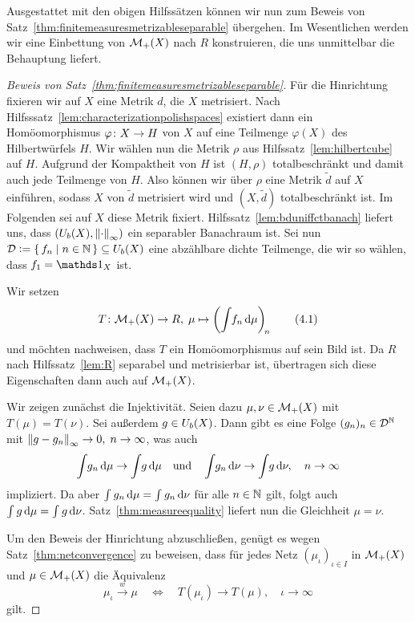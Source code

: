 \documentclass[../main/main.tex]{subfiles}
\begin{document}
	Ausgestattet mit den obigen Hilfssätzen können wir nun zum Beweis von Satz~\ref{thm:finitemeasuresmetrizableseparable} übergehen. Im Wesentlichen werden wir eine Einbettung von $\mathcal{M}_{+}(X)$ nach $R$ konstruieren, die uns unmittelbar die Behauptung liefert.
	
	\begin{proof}[Beweis von Satz~\ref{thm:finitemeasuresmetrizableseparable}]
		Für die Hinrichtung fixieren wir auf $X$ eine Metrik $d$, die $X$ metrisiert. 
		Nach Hilfsssatz~\ref{lem:characterizationpolishspaces} existiert dann ein Homöomorphismus $\varphi \colon X \to H$ von
		$X$ auf eine Teilmenge $\varphi(X)$ des Hilbertwürfels $H$. Wir wählen nun die Metrik $\rho$ aus Hilfssatz~\ref{lem:hilbertcube} auf $H$. Aufgrund der Kompaktheit von $H$ ist
		$(H, \rho)$ totalbeschränkt und damit auch jede Teilmenge von $H$. Also können wir über $\rho$ eine Metrik $\tilde{d}$ auf $X$ einführen, sodass $X$ von $\tilde{d}$ 
		metrisiert wird und $(X, \tilde{d})$ totalbeschränkt ist. Im Folgenden sei auf $X$ diese Metrik fixiert. Hilfssatz~\ref{lem:bduniffctbanach} liefert uns, dass 
		$(U_b(X), \left\lVert\cdot\right\rVert_\infty)$ ein separabler Banachraum ist. Sei nun $\mathcal{D} \vcentcolon = \left\{\, f_n \; \middle| \; n \in \mathbb{N} \,\right\} \subseteq U_b(X)$ eine abzählbare dichte Teilmenge, 
		die wir so wählen, dass $f_1 = \indfct_X$ ist.
		
		Wir setzen
		\[ T \colon \mathcal{M}_{+}(X) \to R, \; \mu \mapsto \left( \int_{} \, f_n \, \mathrm{d}\mu \right)_{\! n}  \label{4.1} \tag{4.1} \]
		und möchten nachweisen, dass $T$ ein Homöomorphismus auf sein Bild ist. Da $R$ nach Hilfssatz~\ref{lem:R} separabel und metrisierbar ist, übertragen sich diese Eigenschaften dann auch auf $\mathcal{M}_{+}(X)$.
		
		Wir zeigen zunächst die Injektivität. Seien dazu $\mu, \nu \in \mathcal{M}_{+}(X)$ mit $T(\mu) = T(\nu)$. 
		Sei außerdem $g \in U_b(X)$. Dann gibt es eine Folge $(g_n)_n \in \mathcal{D}^{\mathbb{N}}$ mit $\left\lVert g - g_n\right\rVert_\infty \to 0, \; n \to \infty$, was auch 
		\[ \int_{} \, g_n \, \mathrm{d}\mu \to \int_{} \, g \, \mathrm{d}\mu \quad \text{und} \quad \int_{} \, g_n \, \mathrm{d}\nu \to \int_{} \, g \, \mathrm{d}\nu, \quad n \to \infty \]
		impliziert. Da aber $\int_{} \, g_n \, \mathrm{d}\mu = \int_{} \, g_n \, \mathrm{d}\nu$ für alle $n \in \mathbb{N}$ gilt, folgt auch $\int_{} \, g \, \mathrm{d}\mu = \int_{} \, g \, \mathrm{d}\nu$.
		Satz~\ref{thm:measureequality} liefert nun die Gleichheit $\mu = \nu$.
		
		Um den Beweis der Hinrichtung abzuschließen, genügt es wegen Satz~\ref{thm:netconvergence} zu beweisen, dass für jedes Netz $(\mu_\iota)_{\iota \in I}$ in $\mathcal{M}_{+}(X)$ und $\mu \in \mathcal{M}_{+}(X)$ die
		Äquivalenz
		\[ \mu_\iota \xrightarrow{w} \mu \quad \iff \quad T(\mu_\iota) \to T(\mu), \quad \iota \to \infty  \]
		gilt.
		

\end{proof}
\end{document}
